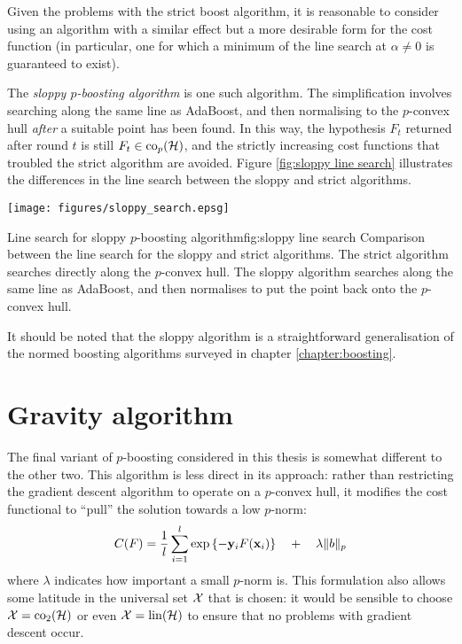 Given the problems with the strict boost algorithm, it is reasonable
to consider using an algorithm with a similar effect but a more
desirable form for the cost function (in particular, one for which a
minimum of the line search at $\alpha \neq 0$ is guaranteed to
exist).

The \emph{sloppy $p$-boosting algorithm} is one such algorithm.  The
simplification involves searching along the same line as AdaBoost, and
then normalising to the $p$-convex hull \emph{after} a suitable point
has been found.  In this way, the hypothesis $F_t$ returned after
round $t$ is still $F_t \in \mathrm{co}_p(\mathcal{H})$, and the strictly increasing
cost functions that troubled the strict algorithm are avoided.  Figure
\ref{fig:sloppy line search} illustrates the differences in the line
search between the sloppy and strict algorithms.

\begin{linefigure}
\begin{center}
\texttt{[image: figures/sloppy\_search.epsg]}
\end{center}
\begin{capt}{Line search for sloppy $p$-boosting algorithm}{fig:sloppy line search}
Comparison between the line search for the sloppy and strict
algorithms.  The strict algorithm searches directly along the
$p$-convex hull.  The sloppy algorithm searches along the same line as
AdaBoost, and then normalises to put the point back onto the
$p$-convex hull.
\end{capt}
\end{linefigure}

It should be noted that the sloppy algorithm is a straightforward
generalisation of the normed boosting algorithms surveyed in chapter
\ref{chapter:boosting}.


\section{Gravity algorithm}

The final variant of $p$-boosting considered in this thesis is
somewhat different to the other two.  This algorithm is less direct in
its approach: rather than restricting the gradient descent algorithm
to operate on a $p$-convex hull, it modifies the cost functional to
``pull'' the solution towards a low $p$-norm:
%
\begin{equation}
C(F) = \frac{1}{l} \sum_{i=1}^{l} \exp
\left\{ -\mathbf{y}_iF(\mathbf{x}_i) \right\} \quad + \quad \lambda \|b\|_p
\label{eqn:regularisation}
\end{equation}
%
where $\lambda$ indicates how important a small $p$-norm is.  This
formulation also allows some latitude in the universal set $\mathcal{X}$
that is chosen: it would be sensible to choose $\mathcal{X} = \mathrm{co}_2(\mathcal{H})$
or even $\mathcal{X} = \mathrm{lin}(\mathcal{H})$ to ensure that no problems with gradient
descent occur.

